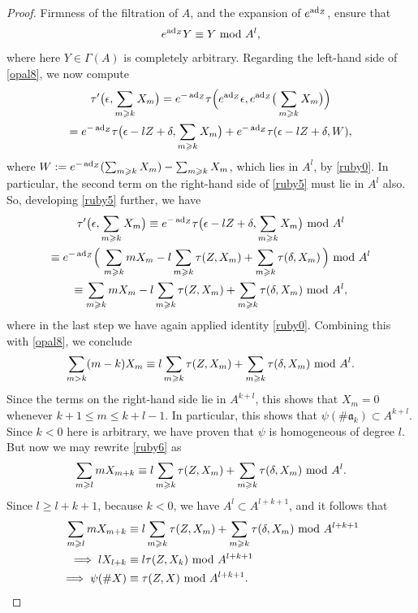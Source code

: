 \documentclass[leqno,12pt]{amsart} %
\begin{document}
\begin{proof}
  Firmness of the filtration of $A$, and the expansion of $e^{\operatorname{ad}_Z}$, ensure that
  \begin{equation}
    \label{ruby0}
     e^{\operatorname{ad}_Z}Y \equiv Y ~\mathrm{mod}~ A^l,
  \end{equation}
  where here $Y \in \Gamma(A)$ is completely arbitrary. Regarding the left-hand side of
  \eqref{opal8}, we now compute
  \begin{gather}
    \tau'\big(\epsilon, \sum_{m\geqslant k}X_m\big) =
    e^{-\operatorname{ad}_Z}\tau\Big(e^{\operatorname{ad}_Z}\epsilon,
    e^{\operatorname{ad}_Z}\big(\sum_{m\geqslant k}X_m\big)\Big)\notag\\
    = e^{-\operatorname{ad}_Z}\tau\big(\epsilon - lZ + \delta, \sum_{m\geqslant k}X_m\big) +
      e^{-\operatorname{ad}_Z}\tau(\epsilon - lZ + \delta, W),\label{ruby5}
  \end{gather}
  where $W := e^{-\operatorname{ad}_Z}(\sum_{m\geqslant k}X_m) - \sum_{m\geqslant k}X_m$, which lies in $A^l$,
  by \eqref{ruby0}. In particular, the second term on the right-hand side of \eqref{ruby5}
  must lie in $A^l$ also. So, developing \eqref{ruby5} further, we have
  \begin{gather*}
    \tau'\big(\epsilon, \sum_{m\geqslant k}X_m\big) \equiv
    e^{-\operatorname{ad}_Z}\tau\big(\epsilon - lZ + \delta, \sum_{m\geqslant k}X_m\big) ~\mathrm{mod}~ A^l \\
    \equiv  e^{-\operatorname{ad}_Z}\Big(\,\sum_{m\geqslant k}m X_m -
      l\sum_{m\geqslant k}\tau(Z, X_m) + \sum_{m\geqslant k}\tau(\delta, X_m)\,\Big) ~\mathrm{mod}~ A^l\\
      \equiv \sum_{m\geqslant k}m X_m - l\sum_{m\geqslant k}\tau(Z, X_m) +
      \sum_{m\geqslant k}\tau(\delta, X_m)\,~\mathrm{mod}~ A^l,
  \end{gather*}
  where in the last step we have again applied identity \eqref{ruby0}. Combining this with
  \eqref{opal8}, we conclude
  \begin{equation}
    \label{ruby6}
    \sum_{m>k}(m-k) X_m \equiv l\sum_{m\geqslant k}\tau(Z, X_m) + \sum_{m\geqslant k}\tau(\delta, X_m)~\mathrm{mod}~ A^l.
  \end{equation}
  Since the terms on the right-hand side lie in $A^{k+l}$, this shows that $X_m=0$
  whenever $k +1 \le m \le k + l -1$. In particular, this shows that
  $\psi(\#{\mathfrak a}_k) \subset A^{k+l}$. Since $k <0$ here is arbitrary, we have
  proven that $\psi $ is homogeneous of degree $l$. But now we may rewrite \eqref{ruby6}
  as
  \begin{equation*}
    \sum_{m \geqslant l} m X_{m+k} \equiv l\sum_{m\geqslant k}\tau(Z,X_m) + \sum_{m\geqslant k}\tau(\delta, X_m)~\mathrm{mod}~ A^l.
  \end{equation*}
  Since $l \ge l + k + 1$, because $k < 0$, we have $A^l \subset A^{l +k +1}$, and it
  follows that
  \begin{align*}
    \sum_{m \geqslant l} m X_{m+k} &\equiv l\sum_{m\geqslant k}\tau(Z,X_m) + \sum_{m\geqslant k}\tau(\delta, X_m)~\mathrm{mod}~ A^{l+k+1}\\
    \implies lX_{l+k} &\equiv l \tau(Z, X_k) ~\mathrm{mod}~ A^{l+k+1}\\
    \implies \psi(\#X) &\equiv \tau(Z, X) ~\mathrm{mod}~ A^{l+k+1}.
  \end{align*}
\end{proof}
\end{document}
